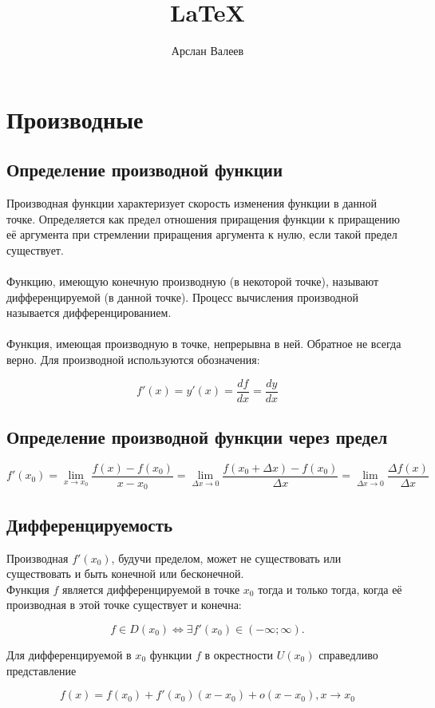 \documentclass[12pt,a4paper]{article}
\title{\LaTeX}
\date{}
\author{Арслан Валеев}
\begin{document}
  

\section{Производные}
\subsection{Определение производной функции}

Производная функции характеризует скорость изменения функции в данной точке. Определяется как предел отношения приращения функции к приращению её аргумента при стремлении приращения аргумента к нулю, если такой предел существует.
\\\\
Функцию, имеющую конечную производную (в некоторой точке), называют дифференцируемой (в данной точке). Процесс вычисления производной называется дифференцированием.
\\\\
Функция, имеющая производную в точке, непрерывна в ней. Обратное не всегда верно.
Для производной используются обозначения:

$$f'(x)=y'(x)=\frac{df}{dx}=\frac{dy}{dx}$$

\subsection{Определение производной функции через предел}

$$f'(x_0)
= \lim_{x \to x_0}\frac{f(x)-f(x_0)}{x-x_0}
= \lim_{\Delta x \to 0}\frac{f(x_0+ \Delta x)-f(x_0)}{\Delta x}
= \lim_{\Delta x \to 0}\frac{\Delta f(x)}{\Delta x}
$$

\subsection{Дифференцируемость}

Производная $f'(x_0)$, будучи пределом, может не существовать или существовать и быть конечной или бесконечной. 
\\
Функция $f$ является дифференцируемой в точке $x_0$ тогда и только тогда, когда её производная в этой точке существует и конечна:

$$f \in D(x_0) \Leftrightarrow \exists f'(x_0) \in (-\infty ; \infty).$$

Для дифференцируемой в $x_0$ функции $f$ в окрестности $U(x_0)$ справедливо представление

$$f(x)=f(x_0)+f'(x_0)(x-x_0)+o(x-x_0), x \rightarrow x_0$$
\end{document}
